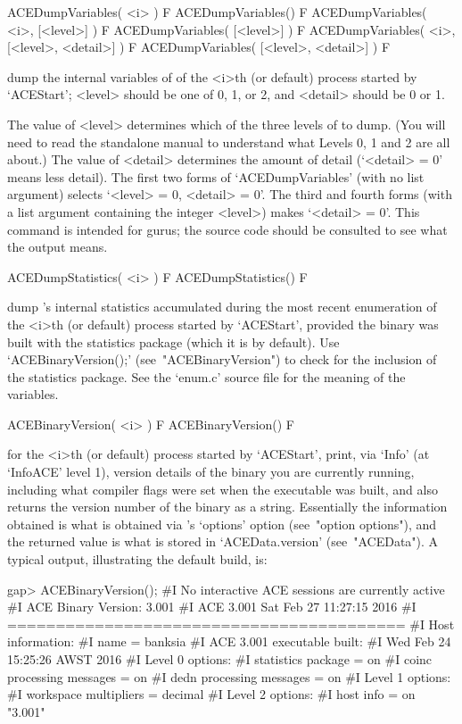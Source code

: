 \>ACEDumpVariables( <i> ) F
\>ACEDumpVariables() F
\>ACEDumpVariables( <i>, [<level>] ) F
\>ACEDumpVariables( [<level>] ) F
\>ACEDumpVariables( <i>, [<level>, <detail>] ) F
\>ACEDumpVariables( [<level>, <detail>] ) F

dump the internal variables  of  {\ACE}  of  the  <i>th  (or  default)
process started by `ACEStart'; <level> should be one of 0,  1,  or  2,
and <detail> should be 0 or 1.

The value of <level> determines which of the three levels of {\ACE} to
dump. (You will need to read the standalone manual to understand  what
Levels 0, 1 and 2 are all about.) The value of <detail> determines the
amount of detail (`<detail> = 0' means less  detail).  The  first  two
forms of `ACEDumpVariables' (with no list argument) selects `<level> =
0, <detail> = 0'. The third and fourth forms  (with  a  list  argument
containing the integer <level>) makes `<detail> = 0'. This command  is
intended for gurus; the source code should be consulted  to  see  what
the output means.

\>ACEDumpStatistics( <i> ) F
\>ACEDumpStatistics() F

dump {\ACE}'s internal statistics accumulated during the  most  recent
enumeration of the <i>th (or default) process started  by  `ACEStart',
provided the {\ACE} binary  was  built  with  the  statistics  package
(which    it    is    by    default).    Use     `ACEBinaryVersion();'
(see~"ACEBinaryVersion") to check for the inclusion of the  statistics
package.  See  the  `enum.c'  source  file  for  the  meaning  of  the
variables.

\>ACEBinaryVersion( <i> ) F
\>ACEBinaryVersion() F

for the <i>th (or default) process started by `ACEStart',  print,  via
`Info' (at `InfoACE' level 1), version details of  the  {\ACE}  binary
you are currently running, including what compiler flags were set when
the executable was built, and also returns the version number  of  the
binary as a string. Essentially the information obtained  is  what  is
obtained via {\ACE}'s `options' option (see~"option options"), and the
returned value is what is stored in `ACEData.version' (see~"ACEData").
A typical output, illustrating the default build, is:

\beginexample
gap> ACEBinaryVersion();
#I  No interactive ACE sessions are currently active
#I  ACE Binary Version: 3.001
#I  ACE 3.001        Sat Feb 27 11:27:15 2016
#I  =========================================
#I  Host information:
#I    name = banksia
#I  ACE 3.001 executable built:
#I    Wed Feb 24 15:25:26 AWST 2016
#I  Level 0 options:
#I    statistics package = on
#I    coinc processing messages = on
#I    dedn processing messages = on
#I  Level 1 options:
#I    workspace multipliers = decimal
#I  Level 2 options:
#I    host info = on
"3.001"


